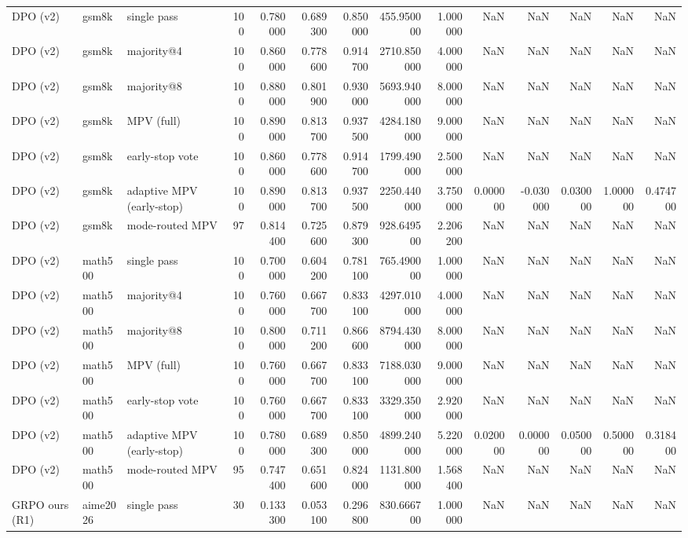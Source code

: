 \begin{table}
\begin{tabular}{lllrrrrrrrrrrr}
DPO (v2) & gsm8k & single pass & 100 & 0.780000 & 0.689300 & 0.850000 & 455.950000 & 1.000000 & NaN & NaN & NaN & NaN & NaN \\
DPO (v2) & gsm8k & majority@4 & 100 & 0.860000 & 0.778600 & 0.914700 & 2710.850000 & 4.000000 & NaN & NaN & NaN & NaN & NaN \\
DPO (v2) & gsm8k & majority@8 & 100 & 0.880000 & 0.801900 & 0.930000 & 5693.940000 & 8.000000 & NaN & NaN & NaN & NaN & NaN \\
DPO (v2) & gsm8k & MPV (full) & 100 & 0.890000 & 0.813700 & 0.937500 & 4284.180000 & 9.000000 & NaN & NaN & NaN & NaN & NaN \\
DPO (v2) & gsm8k & early-stop vote & 100 & 0.860000 & 0.778600 & 0.914700 & 1799.490000 & 2.500000 & NaN & NaN & NaN & NaN & NaN \\
DPO (v2) & gsm8k & adaptive MPV (early-stop) & 100 & 0.890000 & 0.813700 & 0.937500 & 2250.440000 & 3.750000 & 0.000000 & -0.030000 & 0.030000 & 1.000000 & 0.474700 \\
DPO (v2) & gsm8k & mode-routed MPV & 97 & 0.814400 & 0.725600 & 0.879300 & 928.649500 & 2.206200 & NaN & NaN & NaN & NaN & NaN \\
DPO (v2) & math500 & single pass & 100 & 0.700000 & 0.604200 & 0.781100 & 765.490000 & 1.000000 & NaN & NaN & NaN & NaN & NaN \\
DPO (v2) & math500 & majority@4 & 100 & 0.760000 & 0.667700 & 0.833100 & 4297.010000 & 4.000000 & NaN & NaN & NaN & NaN & NaN \\
DPO (v2) & math500 & majority@8 & 100 & 0.800000 & 0.711200 & 0.866600 & 8794.430000 & 8.000000 & NaN & NaN & NaN & NaN & NaN \\
DPO (v2) & math500 & MPV (full) & 100 & 0.760000 & 0.667700 & 0.833100 & 7188.030000 & 9.000000 & NaN & NaN & NaN & NaN & NaN \\
DPO (v2) & math500 & early-stop vote & 100 & 0.760000 & 0.667700 & 0.833100 & 3329.350000 & 2.920000 & NaN & NaN & NaN & NaN & NaN \\
DPO (v2) & math500 & adaptive MPV (early-stop) & 100 & 0.780000 & 0.689300 & 0.850000 & 4899.240000 & 5.220000 & 0.020000 & 0.000000 & 0.050000 & 0.500000 & 0.318400 \\
DPO (v2) & math500 & mode-routed MPV & 95 & 0.747400 & 0.651600 & 0.824000 & 1131.800000 & 1.568400 & NaN & NaN & NaN & NaN & NaN \\
GRPO ours (R1) & aime2026 & single pass & 30 & 0.133300 & 0.053100 & 0.296800 & 830.666700 & 1.000000 & NaN & NaN & NaN & NaN & NaN \\

\end{tabular}
\end{table}
